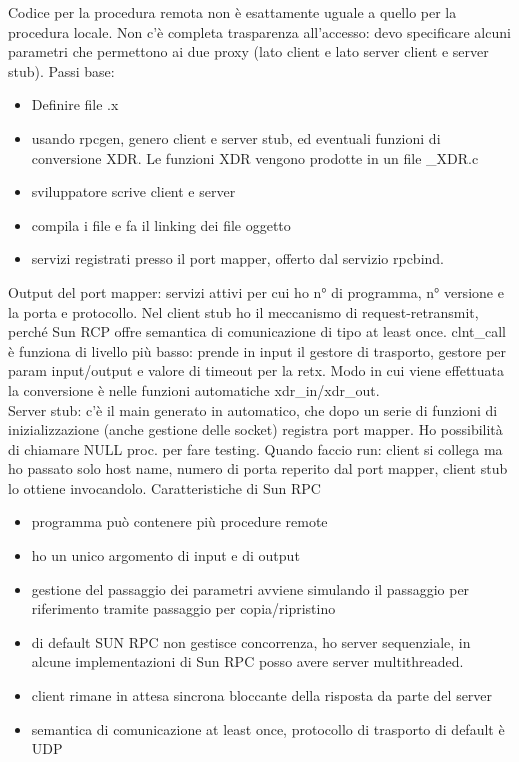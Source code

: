 \documentclass{article}
\begin{document}
Codice per la procedura remota non è esattamente uguale a quello per la procedura locale. Non c'è completa trasparenza all'accesso: devo specificare alcuni parametri che permettono ai due proxy (lato client e lato server client e server stub).
Passi base:
\begin{itemize}
\item Definire file .x
\item usando rpcgen, genero client e server stub, ed eventuali funzioni di conversione XDR. Le funzioni XDR vengono prodotte in un file \_XDR.c
\item sviluppatore scrive client e server
\item compila i file e fa il linking dei file oggetto
\item servizi registrati presso il port mapper, offerto dal servizio rpcbind.
\end{itemize}
Output del port mapper: servizi attivi per cui ho n° di programma, n° versione e la porta e protocollo. Nel client stub ho il meccanismo di request-retransmit, perché Sun RCP offre semantica di comunicazione di tipo at least once. clnt\_call è funziona di livello più basso: prende in input il gestore di trasporto, gestore per param input/output e valore di timeout per la retx. Modo in cui viene effettuata la conversione è nelle funzioni automatiche xdr\_in/xdr\_out.\\ Server stub: c'è il main generato in automatico, che dopo un serie di funzioni di inizializzazione (anche gestione delle socket) registra port mapper. Ho possibilità di chiamare NULL proc. per fare testing. Quando faccio run: client si collega ma ho passato solo host name, numero di porta reperito dal port mapper, client stub lo ottiene invocandolo. Caratteristiche di Sun RPC
\begin{itemize}
\item programma può contenere più procedure remote
\item ho un unico argomento di input e di output
\item gestione del passaggio dei parametri avviene simulando il passaggio per riferimento tramite passaggio per copia/ripristino
\item di default SUN RPC non gestisce concorrenza, ho server sequenziale, in alcune implementazioni di Sun RPC posso avere server multithreaded.
\item client rimane in attesa sincrona bloccante della risposta da parte del server
\item semantica di comunicazione at least once, protocollo di trasporto di default è UDP
\end{itemize}
\end{document}
